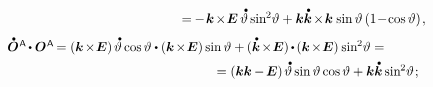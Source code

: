\begin{otherlanguage}{russian}
\begin{fleqn}[0pt]
\begin{multline*}
%
\hspace{13em} \scalebox{0.94}[0.96]{$= \hspace{-0.16ex} - \hspace{.2ex} \bm{k} \hspace{-0.24ex}\times\hspace{-0.4ex} \UnitDyad \hspace{.4ex} \mathdotabove{\vartheta} \sine^{\hspace{-0.1ex}2\hspace{-0.4ex}} \vartheta
+ \bm{k} \mathdotabove{\bm{k}} \hspace{-0.24ex}\times\hspace{-0.32ex} \bm{k} \hspace{.2ex} \sine \vartheta \left({1 \!-\! \cosine \vartheta}\right) \hspace{-0.16ex},$}
\end{multline*}
\begin{multline*}
\shoveleft{\scalebox{0.94}[0.96]{$\mathdotabove{\rotationtensor}^{\mathsf{\hspace{.12ex}A}} \hspace{-0.2ex}\dotp \rotationtensor^{\mathsf{\hspace{.12ex}A}} \hspace{-0.25ex} =
%
( \bm{k} \hspace{-0.24ex}\times\hspace{-0.4ex} \UnitDyad ) \hspace{.32ex} \mathdotabove{\vartheta} \cosine \vartheta \dotp ( \bm{k} \hspace{-0.24ex}\times\hspace{-0.4ex} \UnitDyad ) \sine \vartheta + \hspace{-0.1ex}
( \mathdotabove{\bm{k}} \hspace{-0.24ex}\times\hspace{-0.4ex} \UnitDyad ) \hspace{-0.16ex} \dotp \hspace{-0.16ex} ( \bm{k} \hspace{-0.24ex}\times\hspace{-0.4ex} \UnitDyad ) \hspace{.1ex} \sine^{\hspace{-0.1ex}2\hspace{-0.4ex}} \vartheta = $} \hfill} \\
%
\shoveright{\hfill \hspace{16em} \scalebox{0.94}[0.96]{$= ( \bm{k} \bm{k} \hspace{-0.1ex} - \hspace{-0.2ex} \UnitDyad ) \hspace{.32ex} \mathdotabove{\vartheta} \sine \vartheta \cosine \vartheta
+ \bm{k} \mathdotabove{\bm{k}} \sine^{\hspace{-0.1ex}2\hspace{-0.4ex}} \vartheta \hspace{.2ex};$}}
\end{multline*}
\end{fleqn}


\end{otherlanguage}
